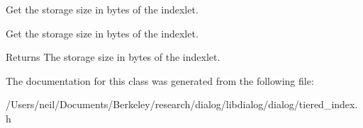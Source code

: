 Get the storage size in bytes of the indexlet. 

Get the storage size in bytes of the indexlet. \begin{DoxyReturn}{Returns}
The storage size in bytes of the indexlet. 
\end{DoxyReturn}


The documentation for this class was generated from the following file\+:\begin{DoxyCompactItemize}
\item 
/\+Users/neil/\+Documents/\+Berkeley/research/dialog/libdialog/dialog/tiered\+\_\+index.\+h\end{DoxyCompactItemize}
